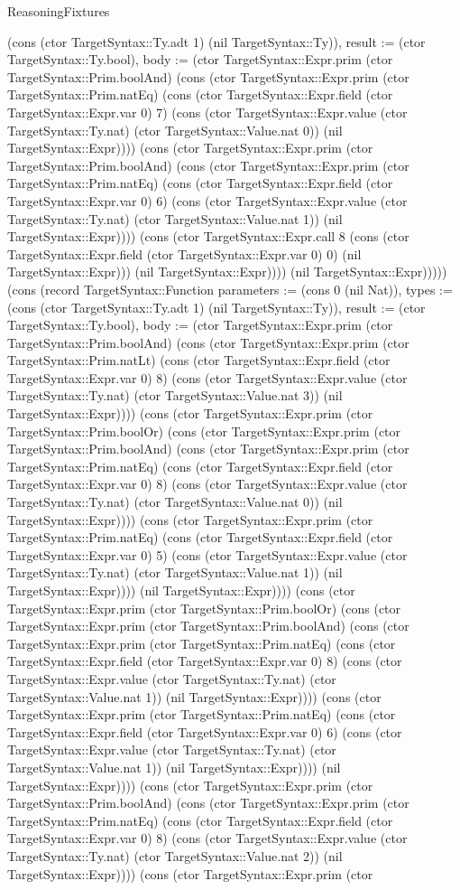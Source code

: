 \begin{lexlean}{ReasoningFixtures}
\begin{semanticmodule}
{(cons (ctor TargetSyntax::Ty.adt 1) (nil TargetSyntax::Ty)), result := (ctor TargetSyntax::Ty.bool), body := (ctor TargetSyntax::Expr.prim (ctor TargetSyntax::Prim.boolAnd) (cons (ctor TargetSyntax::Expr.prim (ctor TargetSyntax::Prim.natEq) (cons (ctor TargetSyntax::Expr.field (ctor TargetSyntax::Expr.var 0) 7) (cons (ctor TargetSyntax::Expr.value (ctor TargetSyntax::Ty.nat) (ctor TargetSyntax::Value.nat 0)) (nil TargetSyntax::Expr)))) (cons (ctor TargetSyntax::Expr.prim (ctor TargetSyntax::Prim.boolAnd) (cons (ctor TargetSyntax::Expr.prim (ctor TargetSyntax::Prim.natEq) (cons (ctor TargetSyntax::Expr.field (ctor TargetSyntax::Expr.var 0) 6) (cons (ctor TargetSyntax::Expr.value (ctor TargetSyntax::Ty.nat) (ctor TargetSyntax::Value.nat 1)) (nil TargetSyntax::Expr)))) (cons (ctor TargetSyntax::Expr.call 8 (cons (ctor TargetSyntax::Expr.field (ctor TargetSyntax::Expr.var 0) 0) (nil TargetSyntax::Expr))) (nil TargetSyntax::Expr)))) (nil TargetSyntax::Expr))))}) (cons (record TargetSyntax::Function {parameters := (cons 0 (nil Nat)), types := (cons (ctor TargetSyntax::Ty.adt 1) (nil TargetSyntax::Ty)), result := (ctor TargetSyntax::Ty.bool), body := (ctor TargetSyntax::Expr.prim (ctor TargetSyntax::Prim.boolAnd) (cons (ctor TargetSyntax::Expr.prim (ctor TargetSyntax::Prim.natLt) (cons (ctor TargetSyntax::Expr.field (ctor TargetSyntax::Expr.var 0) 8) (cons (ctor TargetSyntax::Expr.value (ctor TargetSyntax::Ty.nat) (ctor TargetSyntax::Value.nat 3)) (nil TargetSyntax::Expr)))) (cons (ctor TargetSyntax::Expr.prim (ctor TargetSyntax::Prim.boolOr) (cons (ctor TargetSyntax::Expr.prim (ctor TargetSyntax::Prim.boolAnd) (cons (ctor TargetSyntax::Expr.prim (ctor TargetSyntax::Prim.natEq) (cons (ctor TargetSyntax::Expr.field (ctor TargetSyntax::Expr.var 0) 8) (cons (ctor TargetSyntax::Expr.value (ctor TargetSyntax::Ty.nat) (ctor TargetSyntax::Value.nat 0)) (nil TargetSyntax::Expr)))) (cons (ctor TargetSyntax::Expr.prim (ctor TargetSyntax::Prim.natEq) (cons (ctor TargetSyntax::Expr.field (ctor TargetSyntax::Expr.var 0) 5) (cons (ctor TargetSyntax::Expr.value (ctor TargetSyntax::Ty.nat) (ctor TargetSyntax::Value.nat 1)) (nil TargetSyntax::Expr)))) (nil TargetSyntax::Expr)))) (cons (ctor TargetSyntax::Expr.prim (ctor TargetSyntax::Prim.boolOr) (cons (ctor TargetSyntax::Expr.prim (ctor TargetSyntax::Prim.boolAnd) (cons (ctor TargetSyntax::Expr.prim (ctor TargetSyntax::Prim.natEq) (cons (ctor TargetSyntax::Expr.field (ctor TargetSyntax::Expr.var 0) 8) (cons (ctor TargetSyntax::Expr.value (ctor TargetSyntax::Ty.nat) (ctor TargetSyntax::Value.nat 1)) (nil TargetSyntax::Expr)))) (cons (ctor TargetSyntax::Expr.prim (ctor TargetSyntax::Prim.natEq) (cons (ctor TargetSyntax::Expr.field (ctor TargetSyntax::Expr.var 0) 6) (cons (ctor TargetSyntax::Expr.value (ctor TargetSyntax::Ty.nat) (ctor TargetSyntax::Value.nat 1)) (nil TargetSyntax::Expr)))) (nil TargetSyntax::Expr)))) (cons (ctor TargetSyntax::Expr.prim (ctor TargetSyntax::Prim.boolAnd) (cons (ctor TargetSyntax::Expr.prim (ctor TargetSyntax::Prim.natEq) (cons (ctor TargetSyntax::Expr.field (ctor TargetSyntax::Expr.var 0) 8) (cons (ctor TargetSyntax::Expr.value (ctor TargetSyntax::Ty.nat) (ctor TargetSyntax::Value.nat 2)) (nil TargetSyntax::Expr)))) (cons (ctor TargetSyntax::Expr.prim (ctor }
\end{semanticmodule}
\end{lexlean}
